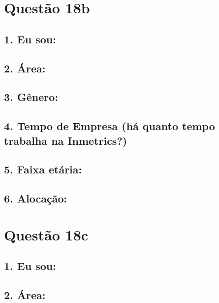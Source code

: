 \documentclass[]{book}
\begin{document}
\hypertarget{questao-18b}{%
\section{Questão 18b}\label{questao-18b}}

\hypertarget{eu-sou-41}{%
\subsection{1. Eu sou:}\label{eu-sou-41}}

\hypertarget{area-41}{%
\subsection{2. Área:}\label{area-41}}

\hypertarget{genero-41}{%
\subsection{3. Gênero:}\label{genero-41}}

\hypertarget{tempo-de-empresa-ha-quanto-tempo-trabalha-na-inmetrics-41}{%
\subsection{4. Tempo de Empresa (há quanto tempo trabalha na Inmetrics?)}\label{tempo-de-empresa-ha-quanto-tempo-trabalha-na-inmetrics-41}}

\hypertarget{faixa-etaria-41}{%
\subsection{5. Faixa etária:}\label{faixa-etaria-41}}

\hypertarget{alocacao-41}{%
\subsection{6. Alocação:}\label{alocacao-41}}

\hypertarget{questao-18c}{%
\section{Questão 18c}\label{questao-18c}}

\hypertarget{eu-sou-42}{%
\subsection{1. Eu sou:}\label{eu-sou-42}}

\hypertarget{area-42}{%
\subsection{2. Área:}\label{area-42}}
\end{document}
